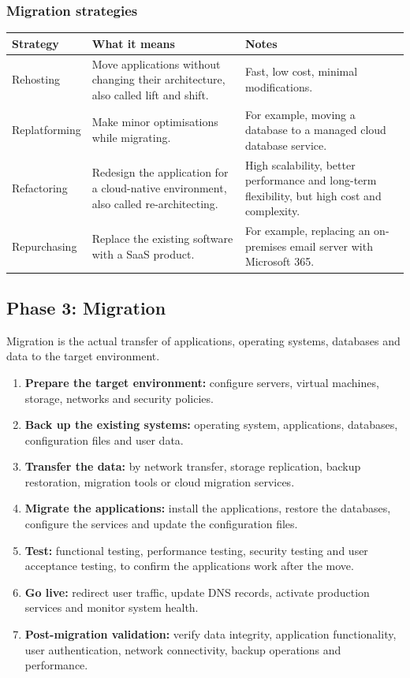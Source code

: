 \documentclass[11pt,a4paper]{article}
\begin{document}
\subsubsection{Migration strategies}

\begin{tabularx}{\textwidth}{@{}lXX@{}}
\toprule
\rowcolor{tablehead}\textbf{Strategy} & \textbf{What it means} & \textbf{Notes} \\
\midrule
Rehosting & Move applications without changing their architecture, also called lift and
shift. & Fast, low cost, minimal modifications. \\
\addlinespace
Replatforming & Make minor optimisations while migrating. & For example, moving a database to
a managed cloud database service. \\
\addlinespace
Refactoring & Redesign the application for a cloud-native environment, also called
re-architecting. & High scalability, better performance and long-term flexibility, but high
cost and complexity. \\
\addlinespace
Repurchasing & Replace the existing software with a SaaS product. & For example, replacing an
on-premises email server with Microsoft 365. \\
\bottomrule
\end{tabularx}

\newpage
\subsection{Phase 3: Migration}

Migration is the actual transfer of applications, operating systems, databases and data to the
target environment.

\begin{enumerate}\itemsep3pt
  \item \textbf{Prepare the target environment:} configure servers, virtual machines, storage,
        networks and security policies.
  \item \textbf{Back up the existing systems:} operating system, applications, databases,
        configuration files and user data.
  \item \textbf{Transfer the data:} by network transfer, storage replication, backup
        restoration, migration tools or cloud migration services.
  \item \textbf{Migrate the applications:} install the applications, restore the databases,
        configure the services and update the configuration files.
  \item \textbf{Test:} functional testing, performance testing, security testing and user
        acceptance testing, to confirm the applications work after the move.
  \item \textbf{Go live:} redirect user traffic, update DNS records, activate production
        services and monitor system health.
  \item \textbf{Post-migration validation:} verify data integrity, application functionality,
        user authentication, network connectivity, backup operations and performance.
\end{enumerate}
\end{document}
